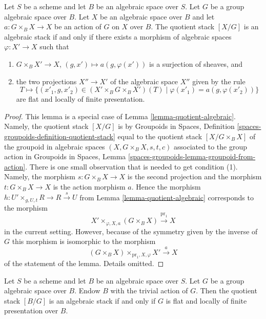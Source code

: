 \begin{lemma}
\label{lemma-group-quotient-algebraic}
Let $S$ be a scheme and let $B$ be an algebraic space over $S$.
Let $G$ be a group algebraic space over $B$.
Let $X$ be an algebraic space over $B$ and let $a : G \times_B X \to X$
be an action of $G$ on $X$ over $B$.
The quotient stack $[X/G]$ is an algebraic stack if and only if
there exists a morphism of algebraic spaces $\varphi : X' \to X$ such that
\begin{enumerate}
\item $G \times_B X' \to X$, $(g, x') \mapsto a(g, \varphi(x'))$ is a
surjection of sheaves, and
\item the two projections $X'' \to X'$ of the algebraic space $X''$
given by the rule
$$
T \longmapsto \{(x'_1, g, x'_2) \in (X' \times_B G \times_B X')(T)
\mid \varphi(x'_1) = a(g, \varphi(x'_2))\}
$$
are flat and locally of finite presentation.
\end{enumerate}
\end{lemma}

\begin{proof}
This lemma is a special case of
Lemma \ref{lemma-quotient-algebraic}.
Namely, the quotient stack $[X/G]$ is by
Groupoids in Spaces, Definition \ref{spaces-groupoids-definition-quotient-stack}
equal to the quotient stack $[X/G \times_B X]$ of the groupoid in
algebraic spaces $(X, G \times_B X, s, t, c)$ associated to
the group action in
Groupoids in Spaces, Lemma \ref{spaces-groupoids-lemma-groupoid-from-action}.
There is one small observation that is needed to get condition (1).
Namely, the morphism $s : G \times_B X \to X$ is the second projection
and the morphism $t :  G \times_B X \to X$ is the action morphism $a$.
Hence the morphism $h : U' \times_{g, U, t} R \to R \xrightarrow{s} U$ from
Lemma \ref{lemma-quotient-algebraic}
corresponds to the morphism
$$
X' \times_{\varphi, X, a} (G \times_B X) \xrightarrow{\text{pr}_1} X
$$
in the current setting. However, because of the symmetry given by
the inverse of $G$ this morphism is isomorphic to the morphism
$$
(G \times_B X) \times_{\text{pr}_1, X, \varphi} X' \xrightarrow{a} X
$$
of the statement of the lemma. Details omitted.
\end{proof}

\begin{lemma}
\label{lemma-BG-algebraic}
Let $S$ be a scheme and let $B$ be an algebraic space over $S$.
Let $G$ be a group algebraic space over $B$.
Endow $B$ with the trivial action of $G$.
Then the quotient stack $[B/G]$ is an algebraic stack
if and only if $G$ is flat and locally of finite presentation over $B$.
\end{lemma}

